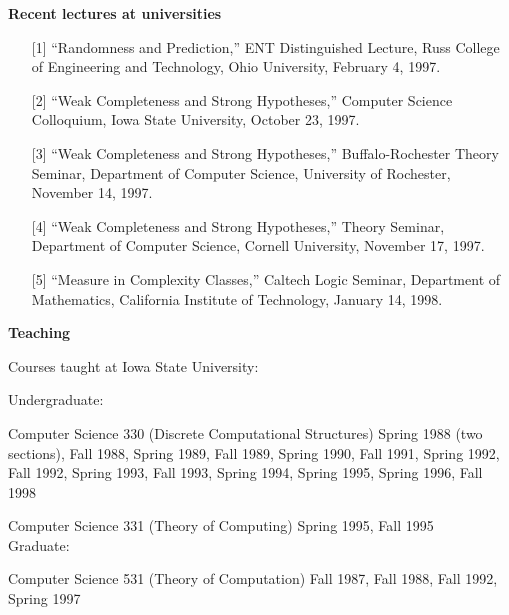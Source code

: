 \vspace*{\bigskipamount}
{\bf Recent lectures at universities}

\begin{enumerate}
\item[{[1]}] ``Randomness and Prediction,'' ENT Distinguished
Lecture, Russ College of Engineering and Technology, Ohio
University, February 4, 1997.
\item[{[2]}] ``Weak Completeness and Strong Hypotheses,''
Computer Science Colloquium, Iowa State University, October
23, 1997.
\item[{[3]}] ``Weak Completeness and Strong Hypotheses,''
Buffalo-Rochester
Theory Seminar, Department of Computer Science, University
of Rochester, November 14, 1997.
\item[{[4]}] ``Weak Completeness and Strong Hypotheses,''
Theory Seminar, Department of Computer Science, Cornell
University, November 17, 1997.
\item[{[5]}] ``Measure in Complexity Classes,''
Caltech Logic Seminar, Department of Mathematics,
California Institute of Technology, January 14, 1998.
\end{enumerate}

\vspace*{\bigskipamount}
{\bf Teaching}

\vspace*{\smallskipamount}
Courses taught at Iowa State University:

\hangindent=0.3in
\vspace*{\smallskipamount}
Undergraduate:

\hspace*{0.6in} Computer Science 330 (Discrete Computational
Structures) Spring
\hangindent=0.9in
1988 (two sections), Fall 1988, Spring 1989, Fall 1989, Spring 1990, Fall
1991, Spring 1992, Fall 1992, Spring 1993, Fall 1993, Spring
1994, Spring 1995, Spring 1996, Fall 1998

\hangindent=0.9in
\hspace*{0.6in} Computer Science 331 (Theory of Computing) Spring 1995, Fall 1995 \\

\vspace*{-0.15in}
\hangindent=0.3in
Graduate:

\hangindent=0.9in
\hspace*{0.6in} Computer Science 531 (Theory of Computation)
Fall 1987, Fall 1988, Fall 1992, Spring 1997

